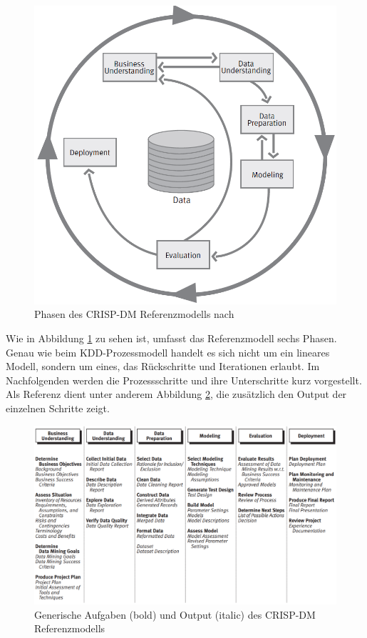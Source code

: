 \begin{figure}[h]
\includegraphics[width=\textwidth]{images/CRISP_DM}
\caption{Phasen des CRISP-DM Referenzmodells nach \citep[S.~10]{chapman_crisp-dm_2000}}
\label{fig:CRISP_DM}
\centering
\end{figure}

Wie in Abbildung \ref{fig:CRISP_DM} zu sehen ist, umfasst das Referenzmodell sechs Phasen. Genau wie beim KDD-Prozessmodell handelt es sich nicht um ein lineares Modell, sondern um eines, das Rückschritte und Iterationen erlaubt. Im Nachfolgenden werden die Prozessschritte und ihre Unterschritte kurz vorgestellt. Als Referenz dient unter anderem Abbildung \ref{fig:CRISP_DM_detailed}, die zusätzlich den Output der einzelnen Schritte zeigt.

\begin{figure}[h]
\includegraphics[width=\textwidth]{images/crisp_dm_detailed}
\caption{Generische Aufgaben (bold) und Output (italic) des CRISP-DM Referenzmodells \citep[S.~12]{chapman_crisp-dm_2000}}
\label{fig:CRISP_DM_detailed}
\centering
\end{figure}


